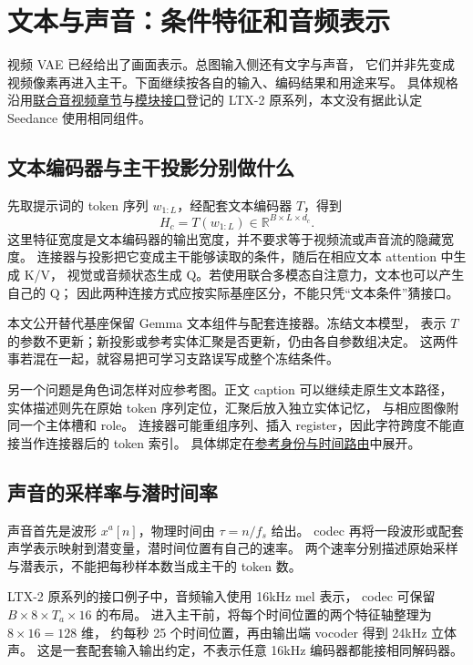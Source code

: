 \chapter{文本与声音：条件特征和音频表示}
\label{seedance-encoders}

视频 VAE 已经给出了画面表示。总图输入侧还有文字与声音，
它们并非先变成视频像素再进入主干。下面继续按各自的输入、编码结果和用途来写。
具体规格沿用\hyperref[seedance-m05]{联合音视频章节}与\hyperref[seedance-m21]{模块接口}登记的
LTX-2 原系列，本文没有据此认定 Seedance 使用相同组件。

\section{文本编码器与主干投影分别做什么}
先取提示词的 token 序列 $w_{1:L}$，经配套文本编码器 $T$，得到
\[
H_c=T(w_{1:L})\in\mathbb R^{B\times L\times d_c}.
\]
这里特征宽度是文本编码器的输出宽度，并不要求等于视频流或声音流的隐藏宽度。
连接器与投影把它变成主干能够读取的条件，随后在相应文本 attention 中生成 K/V，
视觉或音频状态生成 Q。若使用联合多模态自注意力，文本也可以产生自己的 Q；
因此两种连接方式应按实际基座区分，不能只凭“文本条件”猜接口。

本文公开替代基座保留 Gemma 文本组件与配套连接器。冻结文本模型，
表示 $T$ 的参数不更新；新投影或参考实体汇聚是否更新，仍由各自参数组决定。
这两件事若混在一起，就容易把可学习支路误写成整个冻结条件。

另一个问题是角色词怎样对应参考图。正文 caption 可以继续走原生文本路径，
实体描述则先在原始 token 序列定位，汇聚后放入独立实体记忆，
与相应图像附同一个主体槽和 role。
连接器可能重组序列、插入 register，因此字符跨度不能直接当作连接器后的 token 索引。
具体绑定在\hyperref[seedance-m22]{参考身份与时间路由}中展开。

\section{声音的采样率与潜时间率}
声音首先是波形 $x^a[n]$，物理时间由 $\tau=n/f_s$ 给出。
codec 再将一段波形或配套声学表示映射到潜变量，潜时间位置有自己的速率。
两个速率分别描述原始采样与潜表示，不能把每秒样本数当成主干的 token 数。

LTX-2 原系列的接口例子中，音频输入使用 16kHz mel 表示，
codec 可保留 $B\times8\times T_a\times16$ 的布局。
进入主干前，将每个时间位置的两个特征轴整理为 $8\times16=128$ 维，
约每秒 25 个时间位置，再由输出端 vocoder 得到 24kHz 立体声。
这是一套配套输入输出约定，不表示任意 16kHz 编码器都能接相同解码器。

